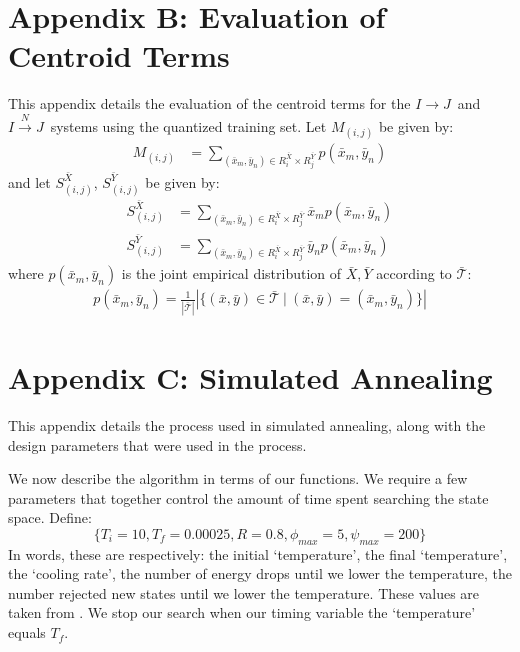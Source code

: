 \documentclass[10pt,twoside,titlepage]{article}
\newcommand{\sysIJN}{\mbox{$I \overset{N}{\rightarrow} J$}}
\newcommand{\sysIJ}{\mbox{$I \rightarrow J$}}
\begin{document}
\section{Appendix B: Evaluation of Centroid Terms}
This appendix details the evaluation of the centroid terms for the \sysIJ\ and \sysIJN\ systems using the quantized training set.
Let $M_{(i,j)}$ be given by:
\begin{align}
    M_{(i,j)} &=
    \sum_{(\bar x_m,\bar y_n)\in R_i^{\bar X}\times R_j^{\bar Y}}p(\bar x_m,\bar y_n)
\end{align}
and let $S_{(i,j)}^{\bar X}$, $S_{(i,j)}^{\bar Y}$ be given by:
\begin{align}
    S^{\bar X}_{(i,j)} &=
    \sum_{(\bar x_m,\bar y_n)\in R_i^{\bar X}\times R_j^{\bar Y}}\bar x_m p(\bar x_m,\bar y_n)\\
    S^{\bar Y}_{(i,j)} &=
    \sum_{(\bar x_m,\bar y_n)\in R_i^{\bar X}\times R_j^{\bar Y}}\bar y_n p(\bar x_m,\bar y_n)
\end{align}
where $p(\bar x_m,\bar y_n)$ is the joint empirical distribution of $\bar X,\bar Y$ according to $\mathcal{\bar T}$:
\begin{align}
    p(\bar x_m,\bar y_n)=\frac{1}{|\mathcal{\bar T}|}\left|\{(\bar x,\bar y)\in\mathcal{\bar T}\ |\ (\bar x,\bar y)=(\bar x_m,\bar y_n)\}\right|
\end{align}

\section{Appendix C: Simulated Annealing}
This appendix details the process used in simulated annealing, along with the design parameters that were used in the process.

We now describe the algorithm in terms of our functions. We require a few parameters that together control the amount of time spent searching the state space. Define:
\begin{equation}
    \{T_i=10,T_f=0.00025,R=0.8,\phi_{max}=5,\psi_{max}=200\}
\end{equation}
In words, these are respectively: the initial `temperature', the final `temperature', the `cooling rate', the number of energy drops until we lower the temperature, the number rejected new states until we lower the temperature. These values are taken from \cite{julien}. We stop our search when our timing variable the `temperature' equals $T_f$.
\end{document}
